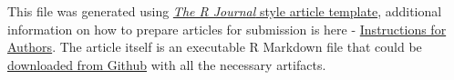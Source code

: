 This file was generated using
\href{https://github.com/rstudio/rticles}{\emph{The R Journal} style
article template}, additional information on how to prepare articles for
submission is here -
\href{https://journal.r-project.org/share/author-guide.pdf}{Instructions
for Authors}. The article itself is an executable R Markdown file that
could be
\href{https://github.com/ivbsoftware/big-data-final-2/blob/master/docs/R_Journal/big-data-final-2/}{downloaded
from Github} with all the necessary artifacts.


\address{%
Vadim Spirkov\\
York University School of Continuing Studies\\
\\
}


\address{%
Murlidhar Loka\\
York University School of Continuing Studies\\
\\
}


